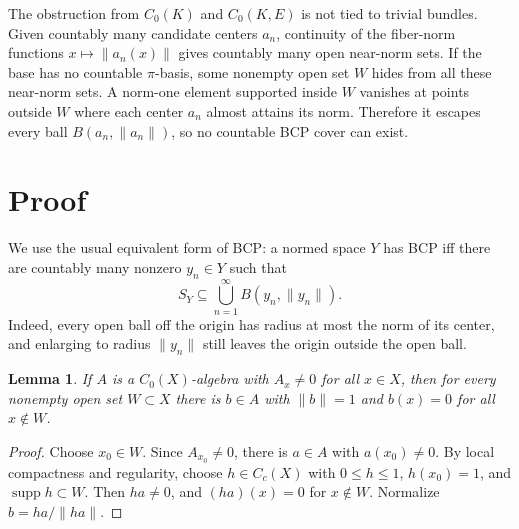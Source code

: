 \documentclass[11pt]{article}
\newtheorem{lemma}{Lemma}
\newcommand{\supp}{\operatorname{supp}}
\begin{document}
The obstruction from \(C_0(K)\) and \(C_0(K,E)\) is not tied to trivial
bundles.  Given countably many candidate centers \(a_n\), continuity of the
fiber-norm functions \(x\mapsto \|a_n(x)\|\) gives countably many open
near-norm sets.
If the base has no countable \(\pi\)-basis, some nonempty open set \(W\) hides
from all these near-norm sets.  A norm-one element supported inside \(W\)
vanishes at points outside \(W\) where each center \(a_n\) almost attains its
norm.  Therefore it escapes every ball \(B(a_n,\|a_n\|)\), so no countable
BCP cover can exist.

\section*{Proof}

We use the usual equivalent form of BCP: a normed space \(Y\) has BCP iff
there are countably many nonzero \(y_n\in Y\) such that
\[
        S_Y\subseteq \bigcup_{n=1}^\infty B(y_n,\|y_n\|).
\]
Indeed, every open ball off the origin has radius at most the norm of its
center, and enlarging to radius \(\|y_n\|\) still leaves the origin outside
the open ball.

\begin{lemma}
\label{lem:local-element}
If \(A\) is a \(C_0(X)\)-algebra with \(A_x\ne0\) for all \(x\in X\), then for
every nonempty open set \(W\subset X\) there is \(b\in A\) with
\(\|b\|=1\) and \(b(x)=0\) for all \(x\notin W\).
\end{lemma}

\begin{proof}
Choose \(x_0\in W\).  Since \(A_{x_0}\ne0\), there is \(a\in A\) with
\(a(x_0)\ne0\).  By local compactness and regularity, choose
\(h\in C_c(X)\) with \(0\le h\le1\), \(h(x_0)=1\), and
\(\supp h\subset W\).  Then \(ha\ne0\), and \((ha)(x)=0\) for
\(x\notin W\).  Normalize \(b=ha/\|ha\|\).
\end{proof}
\end{document}
